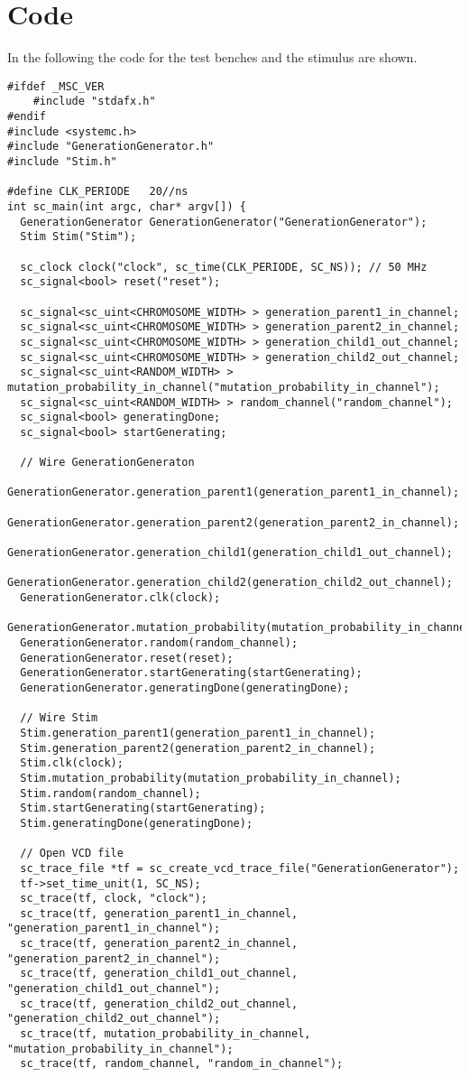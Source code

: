 \section{Code} \label{app:code}

In the following the code for the test benches and the stimulus are shown.

\begin{lstlisting}[style=customc++,caption={Testbench for GenerationGenerator},label={lst:generatorTestbench}]
#ifdef _MSC_VER
	#include "stdafx.h"
#endif
#include <systemc.h>
#include "GenerationGenerator.h"
#include "Stim.h"

#define CLK_PERIODE   20//ns
int sc_main(int argc, char* argv[]) {
  GenerationGenerator GenerationGenerator("GenerationGenerator");
  Stim Stim("Stim");
  
  sc_clock clock("clock", sc_time(CLK_PERIODE, SC_NS)); // 50 MHz
  sc_signal<bool> reset("reset");

  sc_signal<sc_uint<CHROMOSOME_WIDTH> > generation_parent1_in_channel;
  sc_signal<sc_uint<CHROMOSOME_WIDTH> > generation_parent2_in_channel;
  sc_signal<sc_uint<CHROMOSOME_WIDTH> > generation_child1_out_channel;
  sc_signal<sc_uint<CHROMOSOME_WIDTH> > generation_child2_out_channel;
  sc_signal<sc_uint<RANDOM_WIDTH> > mutation_probability_in_channel("mutation_probability_in_channel");
  sc_signal<sc_uint<RANDOM_WIDTH> > random_channel("random_channel");
  sc_signal<bool> generatingDone;
  sc_signal<bool> startGenerating;

  // Wire GenerationGeneraton
  GenerationGenerator.generation_parent1(generation_parent1_in_channel);
  GenerationGenerator.generation_parent2(generation_parent2_in_channel);
  GenerationGenerator.generation_child1(generation_child1_out_channel);
  GenerationGenerator.generation_child2(generation_child2_out_channel);
  GenerationGenerator.clk(clock);
  GenerationGenerator.mutation_probability(mutation_probability_in_channel);
  GenerationGenerator.random(random_channel);
  GenerationGenerator.reset(reset);
  GenerationGenerator.startGenerating(startGenerating);
  GenerationGenerator.generatingDone(generatingDone);

  // Wire Stim
  Stim.generation_parent1(generation_parent1_in_channel);
  Stim.generation_parent2(generation_parent2_in_channel);
  Stim.clk(clock);
  Stim.mutation_probability(mutation_probability_in_channel);
  Stim.random(random_channel);
  Stim.startGenerating(startGenerating);
  Stim.generatingDone(generatingDone);

  // Open VCD file
  sc_trace_file *tf = sc_create_vcd_trace_file("GenerationGenerator");
  tf->set_time_unit(1, SC_NS);
  sc_trace(tf, clock, "clock");
  sc_trace(tf, generation_parent1_in_channel, "generation_parent1_in_channel");
  sc_trace(tf, generation_parent2_in_channel, "generation_parent2_in_channel");
  sc_trace(tf, generation_child1_out_channel, "generation_child1_out_channel");
  sc_trace(tf, generation_child2_out_channel, "generation_child2_out_channel");
  sc_trace(tf, mutation_probability_in_channel, "mutation_probability_in_channel");
  sc_trace(tf, random_channel, "random_in_channel");
  

\end{lstlisting}
